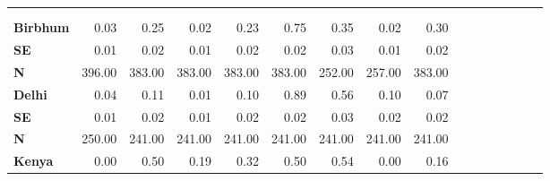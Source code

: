 \begin{tabular}{@{\extracolsep{5pt}}lrrrrrrrrrrrrrrr}
\toprule
&  &  &  &  &  &  &  &  \\
{\bf } &  &  &  &  &  &  &  &  \\
\hline
{\bf Birbhum} & 0.03\phantom{***} & 0.25\phantom{***} & 0.02\phantom{***} & 0.23\phantom{***} & 0.75\phantom{***} & 0.35\phantom{***} & 0.02\phantom{***} & 0.30\phantom{***} \\
{\bf SE} & 0.01\phantom{***} & 0.02\phantom{***} & 0.01\phantom{***} & 0.02\phantom{***} & 0.02\phantom{***} & 0.03\phantom{***} & 0.01\phantom{***} & 0.02\phantom{***} \\
{\bf N} & 396.00\phantom{***} & 383.00\phantom{***} & 383.00\phantom{***} & 383.00\phantom{***} & 383.00\phantom{***} & 252.00\phantom{***} & 257.00\phantom{***} & 383.00\phantom{***} \\
{\bf Delhi} & 0.04\phantom{***} & 0.11\phantom{***} & 0.01\phantom{***} & 0.10\phantom{***} & 0.89\phantom{***} & 0.56\phantom{***} & 0.10\phantom{***} & 0.07\phantom{***} \\
{\bf SE} & 0.01\phantom{***} & 0.02\phantom{***} & 0.01\phantom{***} & 0.02\phantom{***} & 0.02\phantom{***} & 0.03\phantom{***} & 0.02\phantom{***} & 0.02\phantom{***} \\
{\bf N} & 250.00\phantom{***} & 241.00\phantom{***} & 241.00\phantom{***} & 241.00\phantom{***} & 241.00\phantom{***} & 241.00\phantom{***} & 241.00\phantom{***} & 241.00\phantom{***} \\
{\bf Kenya} & 0.00\phantom{***} & 0.50\phantom{***} & 0.19\phantom{***} & 0.32\phantom{***} & 0.50\phantom{***} & 0.54\phantom{***} & 0.00\phantom{***} & 0.16\phantom{***} \\

\end{tabular}
